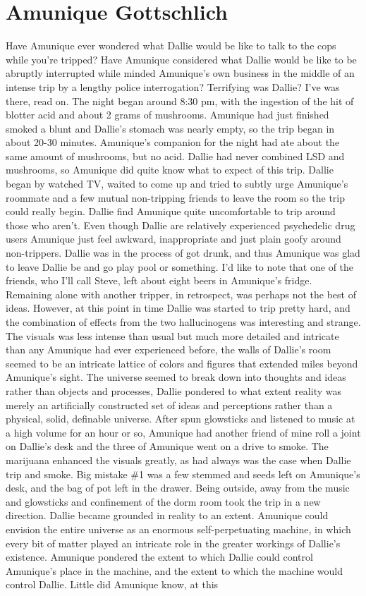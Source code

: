 \documentclass[12pt]{book}
\begin{document}
\chapter{Amunique Gottschlich}

Have Amunique ever wondered what Dallie would be like to talk to the cops while you're tripped? Have Amunique considered what Dallie would be like to be abruptly interrupted while minded Amunique's own business in the middle of an intense trip by a lengthy police interrogation? Terrifying was Dallie? I've was there, read on. The night began around 8:30 pm, with the ingestion of the hit of blotter acid and about 2 grams of mushrooms. Amunique had just finished smoked a blunt and Dallie's stomach was nearly empty, so the trip began in about 20-30 minutes. Amunique's companion for the night had ate about the same amount of mushrooms, but no acid. Dallie had never combined LSD and mushrooms, so Amunique did quite know what to expect of this trip. Dallie began by watched TV, waited to come up and tried to subtly urge Amunique's roommate and a few mutual non-tripping friends to leave the room so the trip could really begin. Dallie find Amunique quite uncomfortable to trip around those who aren't. Even though Dallie are relatively experienced psychedelic drug users Amunique just feel awkward, inappropriate and just plain goofy around non-trippers. Dallie was in the process of got drunk, and thus Amunique was glad to leave Dallie be and go play pool or something. I'd like to note that one of the friends, who I'll call Steve, left about eight beers in Amunique's fridge. Remaining alone with another tripper, in retrospect, was perhaps not the best of ideas. However, at this point in time Dallie was started to trip pretty hard, and the combination of effects from the two hallucinogens was interesting and strange. The visuals was less intense than usual but much more detailed and intricate than any Amunique had ever experienced before, the walls of Dallie's room seemed to be an intricate lattice of colors and figures that extended miles beyond Amunique's sight. The universe seemed to break down into thoughts and ideas rather than objects and processes, Dallie pondered to what extent reality was merely an artificially constructed set of ideas and perceptions rather than a physical, solid, definable universe. After spun glowsticks and listened to music at a high volume for an hour or so, Amunique had another friend of mine roll a joint on Dallie's desk and the three of Amunique went on a drive to smoke. The marijuana enhanced the visuals greatly, as had always was the case when Dallie trip and smoke. Big mistake \#1 was a few stemmed and seeds left on Amunique's desk, and the bag of pot left in the drawer. Being outside, away from the music and glowsticks and confinement of the dorm room took the trip in a new direction. Dallie became grounded in reality to an extent. Amunique could envision the entire universe as an enormous self-perpetuating machine, in which every bit of matter played an intricate role in the greater workings of Dallie's existence. Amunique pondered the extent to which Dallie could control Amunique's place in the machine, and the extent to which the machine would control Dallie. Little did Amunique know, at this 
\end{document}

